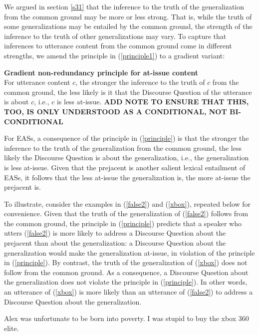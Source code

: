 \documentclass[11pt,fleqn]{article}
\newcommand{\6}{\mbox{$[\hspace*{-.6mm}[$}}
\newcommand{\9}{\mbox{$]\hspace*{-.6mm}]$}}
\begin{document}
We argued in section \ref{s31} that the inference to the truth of the generalization from the common ground may be more or less strong. That is, while the truth of some generalizations may be entailed by the common ground, the strength of the inference to the truth of other generalizations may vary. To capture that inferences to utterance content from the common ground come in different strengths, we amend the principle in (\ref{principle1}) to a gradient variant:

\begin{exe}

\ex\label{principle} {\bf Gradient non-redundancy principle for at-issue content} \\ For utterance content $c$, the stronger the inference to the truth of $c$ from the common ground, the less likely is it that the Discourse Question of the utterance is about $c$, i.e., $c$ is less at-issue. {\bf ADD NOTE TO ENSURE THAT THIS, TOO, IS ONLY UNDERSTOOD AS A CONDITIONAL, NOT BI-CONDITIONAL}

\end{exe}

For EASs, a consequence of the principle in (\ref{principle}) is that the stronger the inference to the truth of the generalization from the common ground, the less likely the Discourse Question is about the generalization, i.e., the generalization is less at-issue. Given that the prejacent is another salient lexical entailment of EASs, it follows that the less at-issue the generalization is, the more at-issue the prejacent is.

To illustrate, consider the examples in (\ref{false2}) and (\ref{xbox}), repeated below for convenience. Given that the truth of the generalization of (\ref{false2}) follows from the common ground, the principle in (\ref{principle}) predicts that a speaker who utters (\ref{false2}) is more likely to address a Discourse Question about the prejacent than about the generalization: a Discourse Question about the generalization would make the generalization at-issue, in violation of the principle in (\ref{principle}). By contrast, the truth of the generalization of (\ref{xbox}) does not follow from the common ground. As a consequence, a Discourse Question about the generalization does not violate the principle in (\ref{principle}). In other words, an utterance of (\ref{xbox}) is more likely than an utterance of (\ref{false2}) to address a Discourse Question about the generalization.

\begin{exe}
\ex\label{false2} Alex was unfortunate to be born into poverty.
\exi{(\ref{xbox})} I was stupid to buy the xbox 360 elite.
\end{exe}
\end{document}
